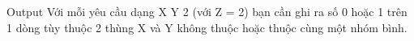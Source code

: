 Output
Với mỗi yêu cầu dạng X Y 2 (với Z = 2) bạn cần ghi ra số 0 hoặc 1 trên 1 dòng tùy thuộc 2 thùng X và Y không thuộc hoặc thuộc cùng một nhóm bình.
